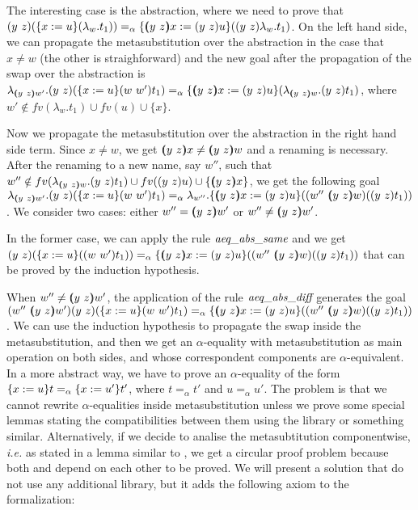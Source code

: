 The interesting case is the abstraction, where we need to prove that $\swap{y}{z}{(\metasub{(\lambda_w.t_1)}{x}{u})} =_\alpha \metasub{(\swap{y}{z}{\lambda_w.t_1})}{\vswap{y}{z}{x}}{\swap{y}{z}{u}}$. On the left hand side, we can propagate the metasubstitution over the abstraction in the case that $x \neq w$ (the other is straighforward) and the new goal after the propagation of the swap over the abstraction is $\lambda_{\vswap{y}{z}{w'}}.\swap{y}{z}{(\metasub{\swap{w}{w'}{t_1}}{x}{u})} =_\alpha \metasub{(\lambda_{\vswap{y}{z}{w}}.\swap{y}{z}{t_1})}{\vswap{y}{z}{x}}{\swap{y}{z}{u}}$, where $w' \notin fv(\lambda_w.t_1) \cup fv(u) \cup \{x\}$.
\begin{coqdoccode}
\end{coqdoccode}
Now we propagate the metasubstitution over the abstraction in the right hand side term. Since $x\neq w$, we get $\vswap{y}{z}{x} \neq \vswap{y}{z}{w}$ and a renaming is necessary. After the renaming to a new name, say $w''$, such that $w'' \notin fv(\lambda_{\vswap{y}{z}{w}}.\swap{y}{z}{t_1}) \cup fv(\swap{y}{z}{u}) \cup \{\vswap{y}{z}{x}\}$, we get the following goal $\lambda_{\vswap{y}{z}{w'}}.\swap{y}{z}{(\metasub{\swap{w}{w'}{t_1}}{x}{u})} =_\alpha \lambda_{w''}.\metasub{(\swap{w''}{\vswap{y}{z}{w}}{(\swap{y}{z}{t_1})})}{\vswap{y}{z}{x}}{\swap{y}{z}{u}}$. We consider two cases: either $w'' = \vswap{y}{z}{w'}$ or $w'' \neq \vswap{y}{z}{w'}$.
\begin{coqdoccode}
\end{coqdoccode}
In the former case, we can apply the rule $\mbox{\it aeq}\_\mbox{\it abs}\_\mbox{\it same}$ and we get $\swap{y}{z}{(\metasub{(\swap{w}{w'}{t_1})}{x}{u})} =_\alpha \metasub{(\swap{w''}{\vswap{y}{z}{w}}{(\swap{y}{z}{t_1})})}{\vswap{y}{z}{x}}{\swap{y}{z}{u}}$ that can be proved by the induction hypothesis.
\begin{coqdoccode}
\end{coqdoccode}
When $w'' \neq \vswap{y}{z}{w'}$, the application of the rule $\mbox{\it aeq}\_\mbox{\it abs}\_\mbox{\it diff}$ generates the goal $\swap{w''}{\vswap{y}{z}{w'}}{\swap{y}{z}{(\metasub{\swap{w}{w'}{t_1}}{x}{u})}} =_\alpha \metasub{(\swap{w''}{\vswap{y}{z}{w}}{(\swap{y}{z}{t_1})})}{\vswap{y}{z}{x}}{\swap{y}{z}{u}}$. We can use the induction hypothesis to propagate the swap inside the metasubstitution, and then we get an $\alpha$-equality with metasubstitution as main operation on both sides, and whose correspondent components are $\alpha$-equivalent. In a more abstract way, we have to prove an $\alpha$-equality of the form $\metasub{t}{x}{u} =_\alpha \metasub{t'}{x}{u'}$, where $t =_\alpha t'$ and $u =_\alpha u'$. The problem is that we cannot rewrite $\alpha$-equalities inside metasubstitution unless we prove some special lemmas stating the compatibilities between them using the  library or something similar. Alternatively, if we decide to analise the metasubtitution componentwise, {\it i.e.} as stated in a lemma similar to , we get a circular proof problem because both  and  depend on each other to be proved. We will present a solution that do not use any additional library, but it adds the following axiom to the formalization:
